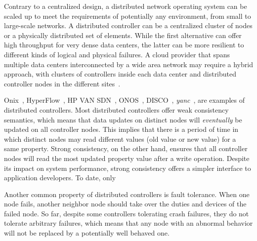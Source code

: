 Contrary to a centralized design, a distributed network operating system can be scaled up to meet the requirements 
of potentially any environment, from small to large-scale networks.
A distributed controller can be 
a centralized cluster of nodes or a physically distributed set of elements. While the first alternative 
can offer high throughput for very dense data centers, the latter can be more resilient to different 
kinds of logical and physical failures.
A cloud provider that spans multiple data centers interconnected by a wide area network may require a hybrid approach, with clusters of controllers inside each data center and 
distributed controller nodes in the different sites~\cite{jain2013-1}.

Onix~\cite{koponen-1}, HyperFlow~\cite{tootoonchian2010},
HP VAN SDN~\cite{hp2013-1}, ONOS~\cite{krishnaswamy2013}, DISCO~\cite{phemius2013},
 \textit{yanc}~\cite{monaco2013},  are examples of distributed controllers. 
Most distributed controllers offer weak consistency semantics, which means that data updates on distinct nodes will \emph{eventually} be updated on 
all controller nodes.
This implies that there is a period of time in which distinct nodes may read different 
values (old value or new value) for a same property.
Strong consistency, on the other hand, ensures that all 
controller nodes will read the most updated property value after a write operation.
Despite its impact on system performance, strong consistency offers a simpler interface to application developers.
To date, only  


Another common property of distributed controllers is fault tolerance.
When one node fails, another neighbor node should take over the duties and devices of the failed node. 
So far, despite some controllers tolerating crash failures, they do not tolerate
arbitrary failures, which means that any node with an abnormal behavior will not be replaced by a potentially 
well behaved one.

